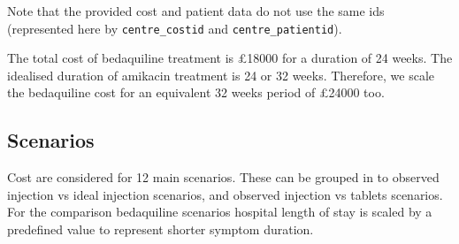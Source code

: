 \documentclass[]{article}
\begin{document}
Note that the provided cost and patient data do not use the same ids
(represented here by \texttt{centre\_costid} and
\texttt{centre\_patientid}).

The total cost of bedaquiline treatment is £18000 for a duration of 24
weeks. The idealised duration of amikacin treatment is 24 or 32 weeks.
Therefore, we scale the bedaquiline cost for an equivalent 32 weeks
period of £24000 too.

\hypertarget{scenarios}{%
\subsection{Scenarios}\label{scenarios}}

Cost are considered for 12 main scenarios. These can be grouped in to
observed injection vs ideal injection scenarios, and observed injection
vs tablets scenarios. For the comparison bedaquiline scenarios hospital
length of stay is scaled by a predefined value to represent shorter
symptom duration.
\end{document}
